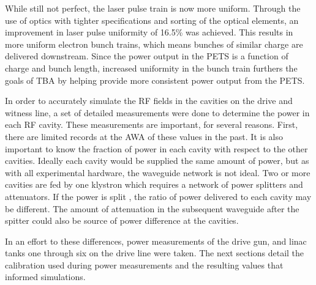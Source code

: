 While still not perfect, the laser pulse train is now more uniform.
Through the use of optics with tighter specifications and sorting of the optical elements, 
an improvement in laser pulse uniformity of 16.5\% was achieved.
This results in more uniform electron bunch trains, which means bunches 
of similar charge are delivered downstream. 
Since the power output in the PETS is a function of charge and bunch length, 
increased uniformity in the bunch train furthers the goals of  TBA 
by helping provide more consistent power output from the PETS.


In order to accurately simulate the RF fields in the  cavities  on the drive and witness line, 
a set of detailed measurements were done to determine the power in each RF cavity.
These measurements are important, for several reasons. 
First, there are limited records at the AWA of these values in the past.
It is also important to know the fraction of power in each cavity 
with respect to the other cavities.
Ideally each cavity would be supplied the same amount of power, 
but as with all experimental hardware, the waveguide network is not ideal.
Two or more cavities are fed by one klystron which requires a network of 
power splitters and attenuators. If the power is  split , the ratio 
of power delivered to each cavity may be different. 
The amount of attenuation in the subsequent waveguide after the spitter could
also be  source of power difference at the cavities.
 
In an effort to  these differences, 
power measurements of the drive gun, and linac tanks 
one through six on the drive line were taken.
The next sections detail the calibration used during power measurements and the 
resulting values that informed simulations. 

